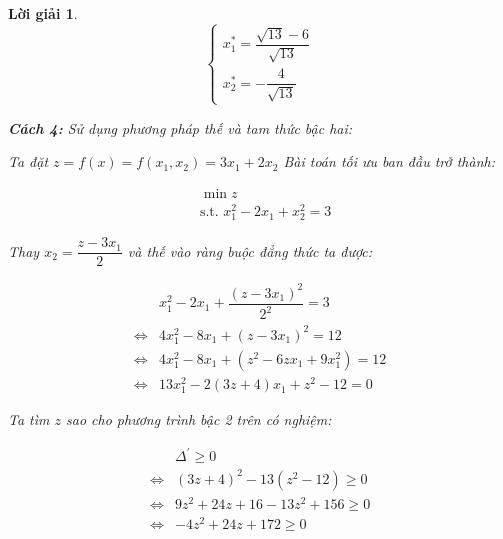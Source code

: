 \documentclass[14pt, a4paper]{article}
\theoremstyle{sltheorem}
\theoremstyle{soltheorem}
\newtheorem*{loigiai}{Lời giải}
\begin{document}
\begin{loigiai}
        \begin{equation*}
            \begin{cases}
            x_1^* = \dfrac{\sqrt{13} - 6}{\sqrt{13}} \\
            x_2^* = -\dfrac{4}{\sqrt{13}}
            \end{cases}
        \end{equation*}

        \textbf{Cách 4:} Sử dụng phương pháp thế và tam thức bậc hai:

        Ta đặt $z = f(x) = f(x_1, x_2) = 3 x_1 + 2 x_2$
        Bài toán tối ưu ban đầu trở thành:

        \begin{equation*}
            \begin{aligned}
                &\min z \\ &\text{s.t. }x_1^2 - 2 x_1 + x_2^2 = 3
            \end{aligned}
        \end{equation*}

        Thay $x_2 = \dfrac{z - 3 x_1}{2}$ và thế vào ràng buộc đẳng thức ta được:

        \begin{equation*}
            \begin{aligned}
                &x_1^2 - 2x_1 + \dfrac{(z - 3 x_1)^2}{2^2}=3 \\
                \Leftrightarrow & 4 x_1^2 - 8 x_1 + (z - 3 x_1)^2 = 12 \\
                \Leftrightarrow & 4 x_1^2 - 8 x_1 + (z^2 - 6z x_1 + 9 x_1^2) = 12 \\
                \Leftrightarrow & 13 x_1^2 - 2(3z + 4)x_1 + z^2 - 12 = 0
            \end{aligned}
        \end{equation*}

        Ta tìm $z$ sao cho phương trình bậc 2 trên có nghiệm:

        \begin{equation*}
            \begin{aligned}
            &\Delta^{\prime} \geq 0 \\
            \Leftrightarrow & (3z + 4)^2 - 13(z^2 - 12) \geq 0 \\
            \Leftrightarrow & 9z^2 + 24z + 16 - 13 z^2 + 156 \geq 0 \\
            \Leftrightarrow & -4 z^2 + 24z + 172 \geq 0
            \end{aligned}
        \end{equation*}


\end{loigiai}
\end{document}

